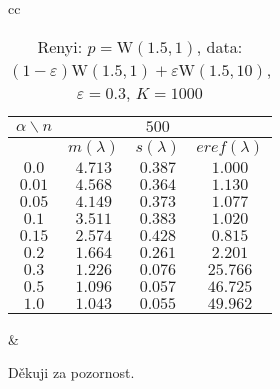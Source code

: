 \documentclass[11pt,a4paper]{beamer}
\begin{document}
\begin{frame}
\begin{table}[ht] \footnotesize 
\begin{center} 
\begin{tabular}{cc}
\begin{tabular}{|c|ccc|} 
\hline 
$\alpha\backslash n$ &&  $500$ & \\ 
\hline 
& $m(\lambda)$ & $s(\lambda)$ & $eref(\lambda)$ \\ 
\hline 
$0.0$ & $ 4.713 $ & $ 0.387 $ & $ 1.000 $\\ 
\hline 
$0.01$ & $ 4.568 $ & $ 0.364 $ & $ 1.130 $\\ 
\hline 
$0.05$ & $ 4.149 $ & $ 0.373 $ & $ 1.077 $\\ 
\hline 
$0.1$ &$ 3.511 $ & $ 0.383 $ & $ 1.020 $\\ 
\hline 
$0.15$ & $ 2.574 $ & $ 0.428 $ & $ 0.815 $\\ 
\hline 
$0.2$ & $ 1.664 $ & $ 0.261 $ & $ 2.201 $\\ 
\hline 
$0.3$ &  $ 1.226 $ & $ 0.076 $ & $ 25.766 $\\ 
\hline 
$0.5$ & $ 1.096 $ & $ 0.057 $ & $ 46.725 $\\ 
\hline 
$1.0$ & $ 1.043 $ & $ 0.055 $ & $ 49.962 $\\ 
\hline 
\end{tabular}
&
\end{tabular}
\caption{Renyi: $p = \mathrm{W}(1.5,1)$, data: $(1-\varepsilon)\mathrm{W}(1.5,1) + \varepsilon \mathrm{W}(1.5,10)$, $\varepsilon =  0.3$, $K = 1000$} 
\end{center}
\end{table}
\end{frame}
%
%		

\begin{frame}
	\begin{center}
		Děkuji za pozornost.
	\end{center}
\end{frame}
\end{document}
